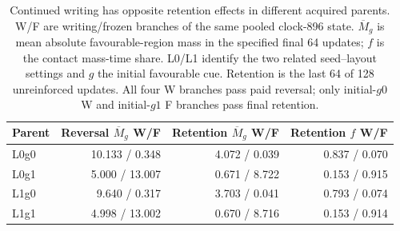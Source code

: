 \begin{table}[htbp]\centering\small
\caption{Continued writing has opposite retention effects in different acquired parents. W/F are writing/frozen branches of the same pooled clock-896 state. $\overline M_g$ is mean absolute favourable-region mass in the specified final 64 updates; $f$ is the contact mass-time share. L0/L1 identify the two related seed--layout settings and $g$ the initial favourable cue. Retention is the last 64 of 128 unreinforced updates. All four W branches pass paid reversal; only initial-$g0$ W and initial-$g1$ F branches pass final retention.}\label{tab:coordinated-pairs}
\begin{tabular}{lrrr}\toprule
Parent & Reversal $\overline M_g$ W/F & Retention $\overline M_g$ W/F & Retention $f$ W/F\\\midrule
L0g0 & 10.133 / 0.348 & 4.072 / 0.039 & 0.837 / 0.070 \\
L0g1 & 5.000 / 13.007 & 0.671 / 8.722 & 0.153 / 0.915 \\
L1g0 & 9.640 / 0.317 & 3.703 / 0.041 & 0.793 / 0.074 \\
L1g1 & 4.998 / 13.002 & 0.670 / 8.716 & 0.153 / 0.914 \\
\bottomrule\end{tabular}
\end{table}
\FloatBarrier
